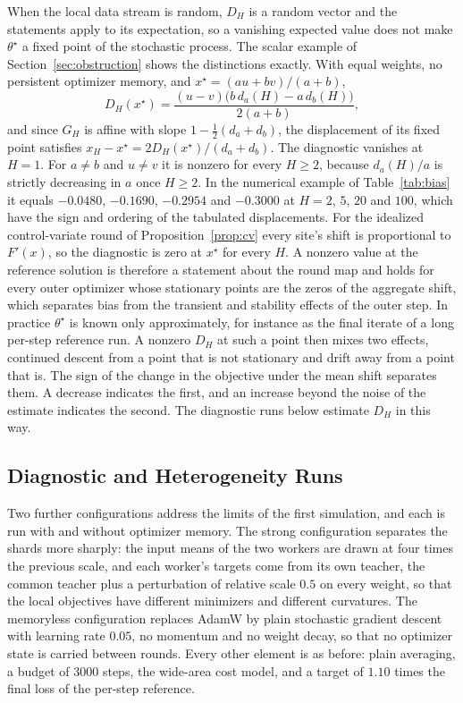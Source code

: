 \documentclass[11pt]{article}
\theoremstyle{definition}
\theoremstyle{remark}
\begin{document}
When the local data stream is random, $D_H$ is a random vector and the statements apply to its expectation, so a vanishing expected value does not make $\theta^\star$ a fixed point of the stochastic process. The scalar example of Section~\ref{sec:obstruction} shows the distinctions exactly. With equal weights, no persistent optimizer memory, and $x^\star=(au+bv)/(a+b)$,
\[
D_H(x^\star)=\frac{(u-v)\bigl(b\,d_a(H)-a\,d_b(H)\bigr)}{2(a+b)},
\]
and since $G_H$ is affine with slope $1-\tfrac12(d_a+d_b)$, the displacement of its fixed point satisfies $x_H-x^\star=2D_H(x^\star)/(d_a+d_b)$. The diagnostic vanishes at $H=1$. For $a\neq b$ and $u\neq v$ it is nonzero for every $H\ge2$, because $d_a(H)/a$ is strictly decreasing in $a$ once $H\ge2$. In the numerical example of Table~\ref{tab:bias} it equals $-0.0480$, $-0.1690$, $-0.2954$ and $-0.3000$ at $H=2$, $5$, $20$ and $100$, which have the sign and ordering of the tabulated displacements. For the idealized control-variate round of Proposition~\ref{prop:cv} every site's shift is proportional to $F'(x)$, so the diagnostic is zero at $x^\star$ for every $H$. A nonzero value at the reference solution is therefore a statement about the round map and holds for every outer optimizer whose stationary points are the zeros of the aggregate shift, which separates bias from the transient and stability effects of the outer step. In practice $\theta^\star$ is known only approximately, for instance as the final iterate of a long per-step reference run. A nonzero $D_H$ at such a point then mixes two effects, continued descent from a point that is not stationary and drift away from a point that is. The sign of the change in the objective under the mean shift separates them. A decrease indicates the first, and an increase beyond the noise of the estimate indicates the second. The diagnostic runs below estimate $D_H$ in this way.

\subsection{Diagnostic and Heterogeneity Runs}

Two further configurations address the limits of the first simulation, and each is run with and without optimizer memory. The strong configuration separates the shards more sharply: the input means of the two workers are drawn at four times the previous scale, and each worker's targets come from its own teacher, the common teacher plus a perturbation of relative scale $0.5$ on every weight, so that the local objectives have different minimizers and different curvatures. The memoryless configuration replaces AdamW by plain stochastic gradient descent with learning rate $0.05$, no momentum and no weight decay, so that no optimizer state is carried between rounds. Every other element is as before: plain averaging, a budget of 3000 steps, the wide-area cost model, and a target of $1.10$ times the final loss of the per-step reference.
\end{document}
